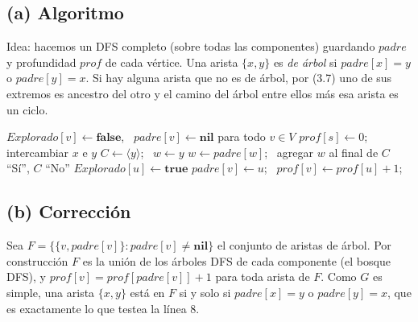 \subsection*{(a) Algoritmo}
Idea: hacemos un DFS completo (sobre todas las componentes) guardando $padre$ y profundidad
$prof$ de cada vértice. Una arista $\{x,y\}$ es \emph{de árbol} si $padre[x]=y$ o $padre[y]=x$. Si
hay alguna arista que no es de árbol, por (3.7) uno de sus extremos es ancestro del otro y el camino
del árbol entre ellos más esa arista es un ciclo.

\begin{algorithm}[H]
\caption{Detección de ciclo con evidencia}
\begin{algorithmic}[1]
  \State $Explorado[v]\gets\textbf{false}$, \ $padre[v]\gets\textbf{nil}$ para todo $v\in V$
     \State $prof[s]\gets 0$; \  \EndIf
  \EndFor
   
       
         intercambiar $x$ e $y$ \EndIf
        \State $C\gets\langle y\rangle$; \ $w\gets y$
          \State $w\gets padre[w]$; \ agregar $w$ al final de $C$
        \EndWhile
        \State \Return ``Sí'', $C$ 
      \EndIf
    \EndFor
  \EndFor
  \State \Return ``No''
\EndFunction
\Statex
{}
  \State $Explorado[u]\gets\textbf{true}$
      \State $padre[v]\gets u$; \ $prof[v]\gets prof[u]+1$; \ 
    \EndIf
  \EndFor
\EndFunction
\end{algorithmic}
\end{algorithm}

\subsection*{(b) Corrección}
Sea $F=\{\{v,padre[v]\}: padre[v]\neq\textbf{nil}\}$ el conjunto de aristas de árbol. Por
construcción $F$ es la unión de los árboles DFS de cada componente (el bosque DFS), y
$prof[v]=prof[padre[v]]+1$ para toda arista de $F$. Como $G$ es simple, una arista $\{x,y\}$ está en
$F$ si y solo si $padre[x]=y$ o $padre[y]=x$, que es exactamente lo que testea la línea 8.

